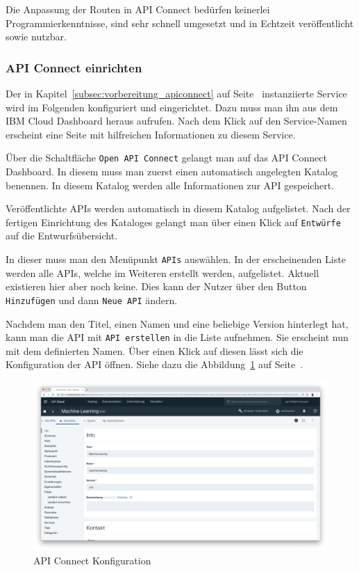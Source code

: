 Die Anpassung der Routen in API Connect bedürfen keinerlei Programmierkenntnisse, sind sehr schnell umgesetzt und in
Echtzeit veröffentlicht sowie nutzbar.

\subsubsection{API Connect einrichten}
Der in Kapitel~\ref{subsec:vorbereitung_apiconnect} auf Seite~\pageref{subsec:vorbereitung_apiconnect} instanziierte
Service wird im Folgenden konfiguriert und eingerichtet. Dazu muss man ihn aus dem IBM Cloud Dashboard heraus aufrufen.
Nach dem Klick auf den Service-Namen erscheint eine Seite mit hilfreichen Informationen zu diesem Service.

Über die Schaltfläche \texttt{Open API Connect} gelangt man auf das API Connect Dashboard. In diesem muss man zuerst
einen automatisch angelegten Katalog benennen. In diesem Katalog werden alle Informationen zur API gespeichert.

Veröffentlichte APIs werden automatisch in diesem Katalog aufgelistet. Nach der fertigen Einrichtung des Kataloges
gelangt man über einen Klick auf \texttt{Entwürfe} auf die Entwurfsübersicht.

In dieser muss man den Menüpunkt \texttt{APIs} auswählen. In der erscheinenden Liste werden alle APIs, welche im
Weiteren erstellt werden, aufgelistet. Aktuell existieren hier aber noch keine. Dies kann der Nutzer über den Button
\texttt{Hinzufügen} und dann \texttt{Neue API} ändern.

Nachdem man den Titel, einen Namen und eine beliebige Version hinterlegt hat, kann man die API mit
\texttt{API erstellen} in die Liste aufnehmen. Sie erscheint nun mit dem definierten Namen. Über einen Klick auf diesen
lässt sich die Konfiguration der API öffnen. Siehe dazu die Abbildung~\ref{fig:umsetzung_apiconnect_config} auf
Seite~\pageref{fig:umsetzung_apiconnect_config}.

\begin{figure}[h]
    \centering
    \includegraphics[width=\textwidth]{images/kapitel_3/apiconnect_config.png}
    \caption{API Connect Konfiguration}
    \label{fig:umsetzung_apiconnect_config}
\end{figure}

